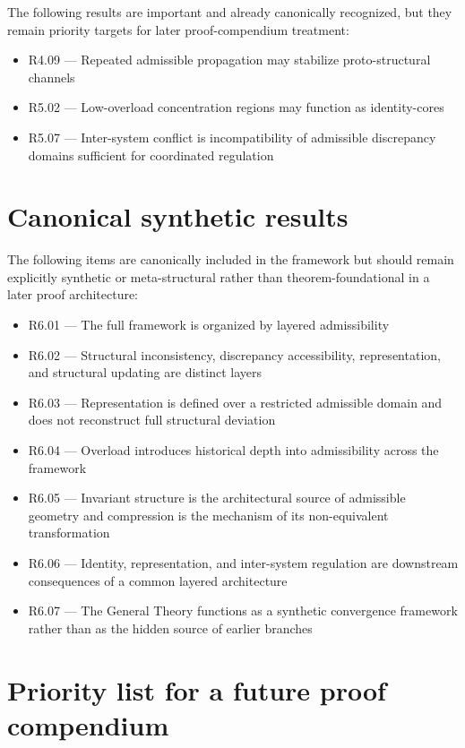 \documentclass[12pt]{article}
\begin{document}
	The following results are important and already canonically recognized, but they remain priority
	targets for later proof-compendium treatment:
	
	\begin{itemize}[leftmargin=2em]
		\item R4.09 --- Repeated admissible propagation may stabilize proto-structural channels
		\item R5.02 --- Low-overload concentration regions may function as identity-cores
		\item R5.07 --- Inter-system conflict is incompatibility of admissible discrepancy domains sufficient for coordinated regulation
	\end{itemize}
	
	\section{Canonical synthetic results}
	
	The following items are canonically included in the framework but should remain explicitly
	synthetic or meta-structural rather than theorem-foundational in a later proof architecture:
	
	\begin{itemize}[leftmargin=2em]
		\item R6.01 --- The full framework is organized by layered admissibility
		\item R6.02 --- Structural inconsistency, discrepancy accessibility, representation, and structural updating are distinct layers
		\item R6.03 --- Representation is defined over a restricted admissible domain and does not reconstruct full structural deviation
		\item R6.04 --- Overload introduces historical depth into admissibility across the framework
		\item R6.05 --- Invariant structure is the architectural source of admissible geometry and compression is the mechanism of its non-equivalent transformation
		\item R6.06 --- Identity, representation, and inter-system regulation are downstream consequences of a common layered architecture
		\item R6.07 --- The General Theory functions as a synthetic convergence framework rather than as the hidden source of earlier branches
	\end{itemize}
	
	\section{Priority list for a future proof compendium}
	
\end{document}
